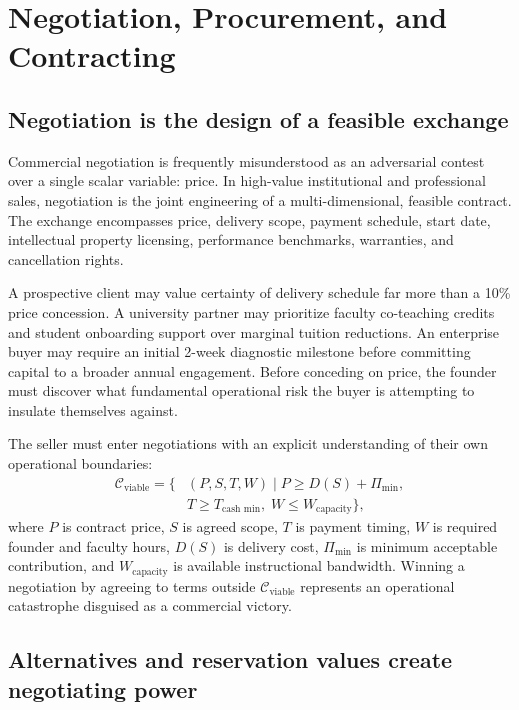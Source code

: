 \section{Negotiation, Procurement, and Contracting}

\subsection{Negotiation is the design of a feasible exchange}

Commercial negotiation is frequently misunderstood as an adversarial contest over a single scalar variable: price. In high-value institutional and professional sales, negotiation is the joint engineering of a multi-dimensional, feasible contract. The exchange encompasses price, delivery scope, payment schedule, start date, intellectual property licensing, performance benchmarks, warranties, and cancellation rights.

A prospective client may value certainty of delivery schedule far more than a 10\% price concession. A university partner may prioritize faculty co-teaching credits and student onboarding support over marginal tuition reductions. An enterprise buyer may require an initial 2-week diagnostic milestone before committing capital to a broader annual engagement. Before conceding on price, the founder must discover what fundamental operational risk the buyer is attempting to insulate themselves against.

The seller must enter negotiations with an explicit understanding of their own operational boundaries:
\begin{equation}
\begin{aligned}
\mathcal{C}_{\text{viable}} = \{ &(P, S, T, W) \mid P \ge D(S) + \Pi_{\text{min}}, \\
&T \ge T_{\text{cash min}}, \; W \le W_{\text{capacity}} \},
\end{aligned}
\end{equation}
where $P$ is contract price, $S$ is agreed scope, $T$ is payment timing, $W$ is required founder and faculty hours, $D(S)$ is delivery cost, $\Pi_{\text{min}}$ is minimum acceptable contribution, and $W_{\text{capacity}}$ is available instructional bandwidth. Winning a negotiation by agreeing to terms outside $\mathcal{C}_{\text{viable}}$ represents an operational catastrophe disguised as a commercial victory.

\subsection{Alternatives and reservation values create negotiating power}

